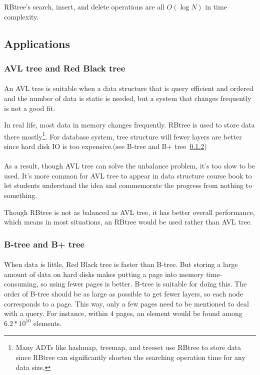 \documentclass{article}
\begin{document}
RBtree's search, insert, and delete operations are all $O(\log N)$ in time complexity.

\newpage


\subsection{Applications}\label{application}

\subsubsection{AVL tree and Red Black tree}
\paragraph{}
An AVL tree is suitable when a data structure that is query efficient and ordered and the number of data is static is needed, but a system that changes frequently is not a good fit.

In real life, most data in memory changes frequently. RBtree is used to store data there mostly\footnote{Many ADTs like hashmap, treemap, and treeset use RBtree to store data since RBtree can significantly shorten the searching operation time for any data size.}.
For database system, tree structure will fewer layers are better since hard disk IO is too expensive.(see B-tree and B+ tree~\ref{b_application})

\paragraph{}
As a result, though AVL tree can solve the unbalance problem, it's too slow to be used. It's more common for AVL tree to appear in data structure course book to let students understand the idea and commemorate the progress from nothing to something.

Though RBtree is not as balanced as AVL tree, it has better overall performance, which means in most situations, an RBtree would be used rather than AVL tree.

\subsubsection{B-tree and B+ tree}\label{b_application}

\paragraph{}
When data is little, Red Black tree is faster than B-tree. But storing a large amount of data on hard disks makes putting a page into memory time-consuming, so using fewer pages is better. B-tree is suitable for doing this. The order of B-tree should be as large as possible to get fewer layers, so each node corresponds to a page. This way, only a few pages need to be mentioned to deal with a query. For instance, within 4 pages, an element would be found among $6.2 * 10^{10}$ elements.
\end{document}
